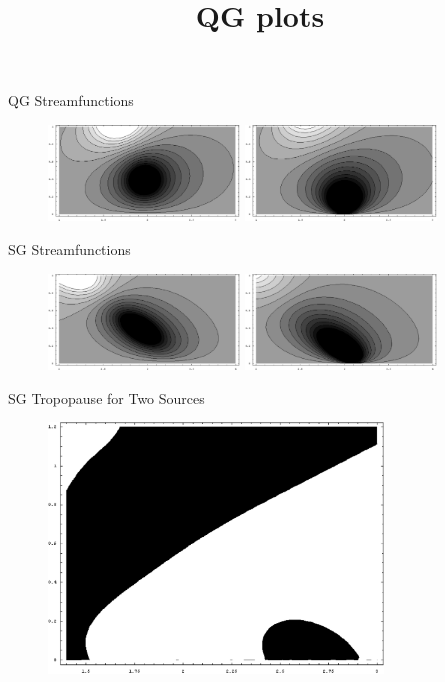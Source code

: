 \documentclass[landscape]{seminar}
\begin{document}
\begin{slide}

\begin{center}
QG Streamfunctions
\begin{figure}
\includegraphics[width=2in]{img/qg_slope_n16_1src_mid.eps}
\includegraphics[width=2in]{img/qg_slope_n16_1src_btm.eps}
\title{QG plots}
\end{figure}

SG Streamfunctions
\begin{figure}
\includegraphics[width=2in]{img/sg_slope_n16_s075_1src_mid.eps}
\includegraphics[width=2in]{img/sg_slope_n16_s075_1src_btm.eps}
\end{figure}
\end{center}

\end{slide}
\begin{slide}

\begin{center}
SG Tropopause for Two Sources
\begin{figure}
\includegraphics[width=3.5in]{img/sg_slope_2src_surface.eps}
\end{figure}
\end{center}

\end{slide}
\end{document}
